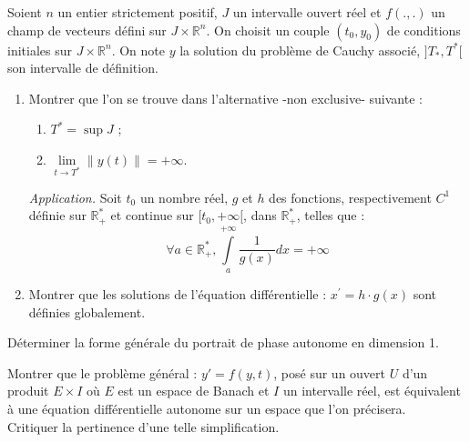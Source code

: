 \begin{exer}
Soient $n$ un entier strictement positif, $J$ un intervalle ouvert réel %
et $f(.,.)$ un champ de vecteurs défini sur $J \times \mathbb{R}^n$. %
On choisit un couple $(t_0,y_0)$ de conditions initiales sur $J \times \mathbb{R}^n$. %
On note $y$ la solution du problème de Cauchy associé, $] T_{\ast} , T^{\ast} [$ son intervalle de définition.
\begin{enumerate}
\item Montrer que l'on se trouve dans l'alternative -non exclusive- suivante :
\begin{enumerate}
\item $T^{\ast} = \sup J$ ;
\item $\lim\limits_{t \rightarrow T^{\ast}} \| y(t) \| = + \infty$.
\end{enumerate}

\smallskip
\textit{Application.} Soit $t_0$ un nombre réel, $g$ et $h$ des fonctions, respectivement $C^1$ %
définie sur $\mathbb{R}_+^{\ast}$ et continue sur $[t_0 , + \infty [$, dans $\mathbb{R}_+^{\ast}$, telles que :
\[\forall a \in \mathbb{R}_+^{\ast} , \int\limits_a^{+ \infty} \frac{1}{g(x)} dx = + \infty\]
\item Montrer que les solutions de l'équation différentielle : $x^{'} = h \cdot g(x)$ sont définies globalement.
\end{enumerate}
\end{exer}

\begin{exer}
Déterminer la forme générale du portrait de phase autonome en dimension 1.
\end{exer}

\begin{exer}
Montrer que le problème général : $y' = f(y,t)$, posé sur un ouvert $U$ d'un produit $E \times I$ %
où $E$ est un espace de Banach et $I$ un intervalle réel, %
est équivalent à une équation différentielle autonome sur un espace que l'on précisera.\\
Critiquer la pertinence d'une telle simplification.
\end{exer}